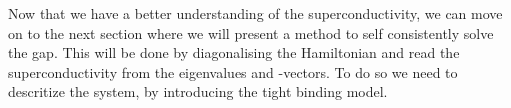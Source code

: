 \documentclass[../main.tex]{subfile}
\begin{document}
Now that we have a better understanding of the superconductivity, we can move on to the next section where we will present a method to self consistently solve
the gap. This will be done by diagonalising the Hamiltonian and read the superconductivity from the eigenvalues and -vectors. To do so we need to descritize the
system, by introducing the tight binding model.\\
\end{document}
